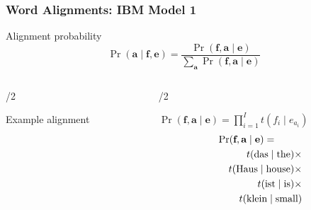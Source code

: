 \begin{frame}
\frametitle{Word Alignments: IBM Model 1}
\begin{block}{Alignment probability}
\[ \Pr(\textbf{a} \mid \textbf{f}, \textbf{e}) = \frac{ \Pr( \textbf{f}, \textbf{a} \mid \textbf{e} ) }{ \sum_{\textbf{a}} \Pr(\textbf{f}, \textbf{a} \mid \textbf{e}) } 
\]
\end{block}\pause
\begin{columns}[t]

\begin{column}{\textwidth/2}
\begin{block}{Example alignment}
\end{block}
\end{column}\pause

\begin{column}{\textwidth/2}
\begin{block}{$\Pr(\textbf{f}, \textbf{a} \mid \textbf{e}) = \prod_{i=1}^I t(f_i \mid e_{a_i})$}
\begin{eqnarray*}
\lefteqn{\Pr( \textbf{f}, \textbf{a} \mid \textbf{e} ) =}\\
&& t(\textrm{das} \mid \textrm{the}) \times \\
&& t(\textrm{Haus} \mid \textrm{house}) \times \\
&& t(\textrm{ist} \mid \textrm{is}) \times \\
&& t(\textrm{klein} \mid \textrm{small})
\end{eqnarray*}
\end{block}
\end{column}

\end{columns}
\end{frame}


